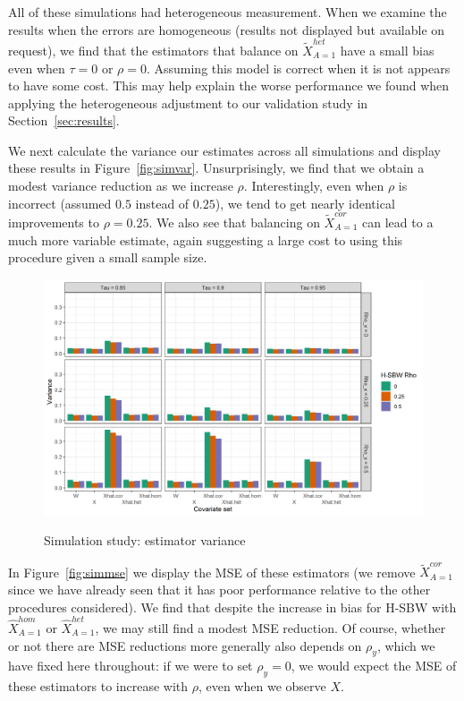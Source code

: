 All of these simulations had heterogeneous measurement. When we examine the results when the errors are homogeneous (results not displayed but available on request), we find that the estimators that balance on $\tilde{X}^{het}_{A=1}$ have a small bias even when $\tau = 0$ or $\rho = 0$. Assuming this model is correct when it is not appears to have some cost. This may help explain the worse performance we found when applying the heterogeneous adjustment to our validation study in Section~\ref{sec:results}.

We next calculate the variance our estimates across all simulations and display these results in Figure~\ref{fig:simvar}. Unsurprisingly, we find that we obtain a modest variance reduction as we increase $\rho$. Interestingly, even when $\rho$ is incorrect (assumed $0.5$ instead of $0.25$), we tend to get nearly identical improvements to $\rho = 0.25$. We also see that balancing on $\tilde{X}^{cor}_{A=1}$ can lead to a much more variable estimate, again suggesting a large cost to using this procedure given a small sample size.

\begin{figure}[H]
\begin{center}
    \caption{Simulation study: estimator variance}\label{fig:simvar}
    \label{fig:loveplotc1}
    \includegraphics[scale=0.5]{01_Plots/var-plot.png}
\end{center}
\end{figure}

In Figure~\ref{fig:simmse} we display the MSE of these estimators (we remove $\tilde{X}_{A=1}^{cor}$ since we have already seen that it has poor performance relative to the other procedures considered). We find that despite the increase in bias for H-SBW with $\hat{X}_{A=1}^{hom}$ or $\hat{X}_{A=1}^{het}$, we may still find a modest MSE reduction. Of course, whether or not there are MSE reductions more generally also depends on $\rho_y$, which we have fixed here throughout: if we were to set $\rho_y = 0$, we would expect the MSE of these estimators to increase with $\rho$, even when we observe $X$. 

